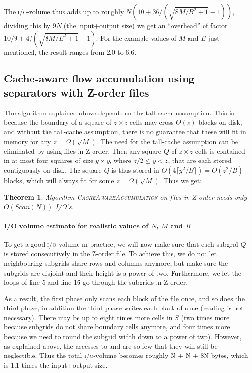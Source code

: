 \documentclass[10pt,a4paper]{article}
\newtheorem{theorem}{Theorem}
\def\io{\textsc{i/o}\xspace}
\def\scan{\mathit{Scan}}
\begin{document}
The \io-volume thus adds up to roughly $N (10 + 36/(\sqrt{8M/B^2+1}-1))$, dividing this by $9N$ (the input+output size) we get an ``overhead'' of factor $10/9 + 4/(\sqrt{8M/B^2+1}-1)$. For the example values of $M$ and $B$ just mentioned, the result ranges from 2.0 to 6.6.

\subsection{Cache-aware flow accumulation using separators with Z-order files}\label{sec:cacheawareaccumulationZorder}

The algorithm explained above depends on the tall-cache assumption. This is because the boundary of a square of $z \times z$ cells may cross $\Theta(z)$ blocks on disk, and without the tall-cache assumption, there is no guarantee that these will fit in memory for any $z = \Omega(\sqrt M)$. The need for the tall-cache assumption can be eliminated by using files in Z-order. Then any square $Q$ of $z \times z$ cells is contained in at most four squares of size $y \times y$, where $z/2 \leq y < z$, that are each stored contiguously on disk. The square $Q$ is thus stored in $O(4 \lceil y^2/B \rceil) = O(z^2/B)$ blocks, which will always fit for some $z = \Omega(\sqrt M)$. Thus we get:

\begin{theorem}\label{CacheAwareAccumulation}
Algorithm \textsc{CacheAwareAccumulation} on files in Z-order needs only $O(\scan(N))$ I/O's.
\end{theorem}

\paragraph*{I/O-volume estimate for realistic values of $N$, $M$ and $B$}
To get a good \io-volume in practice, we will now make sure that each subgrid $Q$ is stored consecutively in the Z-order file. To achieve this, we do not let neighbouring subgrids share rows and columns anymore, but make sure the subgrids are disjoint and their height is a power of two. Furthermore, we let the loops of line 5 and line 16 go through the subgrids in Z-order.

As a result, the first phase only scans each block of the  file once, and so does the third phase; in addition the third phase writes each block of  once (reading is not necessary). There may be up to eight times more cells in $S$ (two times more because subgrids do not share boundary cells anymore, and four times more because we need to round the subgrid width down to a power of two). However, as explained above, the accesses to  and  are so few that they will still be neglectible. Thus the total \io-volume becomes roughly N + N + 8N bytes, which is 1.1 times the input+output size.
\end{document}
